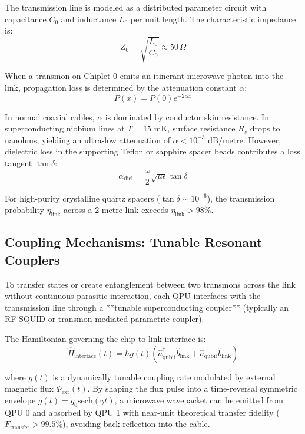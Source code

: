 The transmission line is modeled as a distributed parameter circuit with capacitance $C_0$ and inductance $L_0$ per unit length. The characteristic impedance is:
\begin{equation}
    Z_0 = \sqrt{\frac{L_0}{C_0}} \approx 50\,\Omega
\end{equation}

When a transmon on Chiplet 0 emits an itinerant microwave photon into the link, propagation loss is determined by the attenuation constant $\alpha$:
\begin{equation}
    P(x) = P(0) e^{-2\alpha x}
\end{equation}

In normal coaxial cables, $\alpha$ is dominated by conductor skin resistance. In superconducting niobium lines at $T = 15\text{ mK}$, surface resistance $R_s$ drops to nanohms, yielding an ultra-low attenuation of $\alpha < 10^{-3}\text{ dB/metre}$. However, dielectric loss in the supporting Teflon or sapphire spacer beads contributes a loss tangent $\tan \delta$:
\begin{equation}
    \alpha_{\text{diel}} = \frac{\omega}{2} \sqrt{\mu \epsilon} \tan \delta
\end{equation}

For high-purity crystalline quartz spacers ($\tan \delta \sim 10^{-6}$), the transmission probability $\eta_{\text{link}}$ across a 2-metre link exceeds $\eta_{\text{link}} > 98\%$.

\subsection{Coupling Mechanisms: Tunable Resonant Couplers}
To transfer states or create entanglement between two transmons across the link without continuous parasitic interaction, each QPU interfaces with the transmission line through a **tunable superconducting coupler** (typically an RF-SQUID or transmon-mediated parametric coupler).

The Hamiltonian governing the chip-to-link interface is:
\begin{equation}
    \hat{H}_{\text{interface}}(t) = \hbar g(t) \left( \hat{a}_{\text{qubit}}^\dagger \hat{b}_{\text{link}} + \hat{a}_{\text{qubit}} \hat{b}_{\text{link}}^\dagger \right)
\end{equation}

where $g(t)$ is a dynamically tunable coupling rate modulated by external magnetic flux $\Phi_{\text{ext}}(t)$. By shaping the flux pulse into a time-reversal symmetric envelope $g(t) = g_0 \text{sech}(\gamma t)$, a microwave wavepacket can be emitted from QPU 0 and absorbed by QPU 1 with near-unit theoretical transfer fidelity ($F_{\text{transfer}} > 99.5\%$), avoiding back-reflection into the cable.

